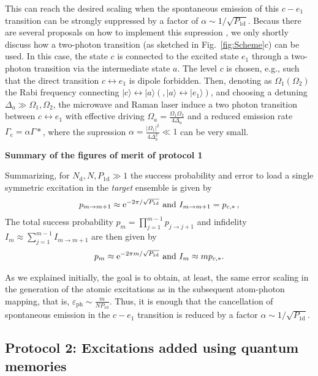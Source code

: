 \documentclass[twocolumn,pra,aps,superscriptaddress,showpacs]{revtex4-1}
\newcommand{\ket}[1]{|#1\rangle}
\def\oned{\mathrm{1d}}
\def\ee{\mathord{\rm e}}
\newcommand{\rd}{\mathrm{d}}
\begin{document}
This can reach the desired scaling when the spontaneous emission of this $c-e_1$ transition can be strongly suppressed by a factor of $\alpha \sim 1/\sqrt{P_\oned}$. Becaus there are several proposals on how to implement this supression \cite{porras08a,borregaard15a}, we only shortly discuss how a two-photon transition (as sketched in Fig.~\ref{fig:Scheme}c) can be used.
In this case, the state $c$ is connected to the excited state $e_1$ through a two-photon transition via the intermediate state $a$. The level $c$ is chosen, e.g., such that the direct transition $c \leftrightarrow e_1$ is dipole forbidden. Then, denoting as $\Omega_1 (\Omega_2)$ the Rabi 
frequency connecting $\ket{c}\leftrightarrow \ket{a} (,\ket{a}\leftrightarrow \ket{e_1})$, and choosing a detuning $\Delta_a\gg \Omega_1,\Omega_2$, the microwave and Raman laser induce a two photon transition between $c \leftrightarrow e_1$ with effective driving $\Omega_{a}=\frac{\Omega_1\Omega_2}{4\Delta_a}$ and a reduced emission rate $\Gamma_\mathrm{c}=\alpha\Gamma*$, where the supression $\alpha = \frac{|\Omega_1|^2}{4 \Delta_a^2} \ll 1$ can be very small.

\textbf{Summary of the figures of merit of protocol 1}

Summarizing, for $N_\rd,N, P_\oned \gg 1$ the success probability and error to load a single symmetric excitation in the \emph{target} ensemble is given by
\begin{align}
p_{m \rightarrow m+1} 
	\approx \ee^{-2 \pi / \sqrt{P_\oned}} \ \mathrm{and} \
I_{m\rightarrow m+1} 
	=p_{c,*}\,,
\end{align}
%
The total success probability $p_m = \prod_{j=1}^{m-1} p_{j \rightarrow j+1} $ and infidelity 	$I_{m} \approx \sum_{j = 1}^{m-1} I_{m\rightarrow m+1}$ are then given by
\begin{align}
	p_m \approx  \ee^{-2 \pi m / \sqrt{P_\oned}} \ \mathrm{and} \
	I_m \approx m p_{c,*}.
\end{align}

As we explained initially, the goal is to obtain, at least, the same error scaling in the generation of the atomic excitations as in the subsequent atom-photon mapping, that is, $\varepsilon_\mathrm{ph} \sim \frac{m}{N P_\oned}$. Thus, it is enough that the cancellation of spontaneous emission in the $c-e_1$ transition is reduced by a factor $\alpha \sim 1/\sqrt{P_\oned}$.

\subsection{Protocol 2: Excitations added using quantum memories \label{sec:protocol2}}
\end{document}
